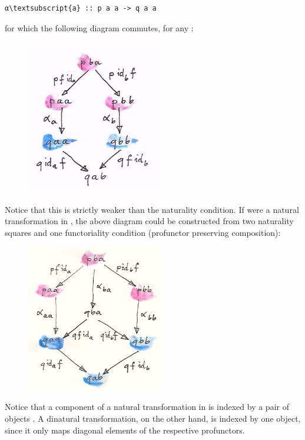 \begin{Verbatim}[commandchars=\\\{\}]
α\textsubscript{a} :: p a a -> q a a
\end{Verbatim}
for which the following diagram commutes, for any
:

\begin{figure}[H]
\centering
\includegraphics[width=60mm]{images/end.jpg}
\end{figure}

\noindent
Notice that this is strictly weaker than the naturality condition. If
 were a natural transformation in
, the above diagram could be constructed
from two naturality squares and one functoriality condition (profunctor
 preserving composition):

\begin{figure}[H]
\centering
\includegraphics[width=60mm]{images/end-1.jpg}
\end{figure}

\noindent
Notice that a component of a natural transformation  in
 is indexed by a pair of objects
. A dinatural transformation, on the other hand, is
indexed by one object, since it only maps diagonal elements of the
respective profunctors.

